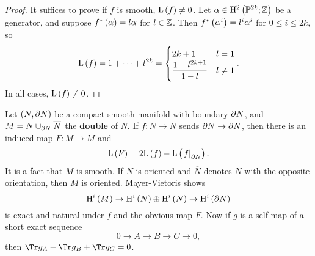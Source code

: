 \begin{proof}
It suffices to prove if $ f $ is smooth, $ \L\br{f} \ne 0 $. Let $ \alpha \in \H^2\br{\PP^{2k}; \ZZ} $ be a generator, and suppose $ f^*\br{\alpha} = l\alpha $ for $ l \in \mathbb{Z} $. Then $ f^*\br{\alpha^i} = l^i\alpha^i $ for $ 0 \le i \le 2k $, so
$$ \L\br{f} = 1 + \dots + l^{2k} =
\begin{cases}
2k + 1 & l = 1 \\
\dfrac{1 - l^{2k + 1}}{1 - l} & l \ne 1
\end{cases}.
$$
In all cases, $ \L\br{f} \ne 0 $.
\end{proof}

\begin{example*}
Let $ \br{N, \da N} $ be a compact smooth manifold with boundary $ \partial N $, and $ M = N \cup_{\partial N} \overline{N} $ the \textbf{double} of $ N $. If $ f : N \to N $ sends $ \partial N \to \partial N $, then there is an induced map $ F : M \to M $ and
$$ \L\br{F} = 2\L\br{f} - \L\br{\eval{f}_{\da N}}. $$
It is a fact that $ M $ is smooth. If $ N $ is oriented and $ \overline{N} $ denotes $ N $ with the opposite orientation, then $ M $ is oriented. Mayer-Vietoris shows
$$ \H^i\br{M} \to \H^i\br{N} \oplus \H^i\br{N} \to \H^i\br{\da N} $$
is exact and natural under $ f $ and the obvious map $ F $. Now if $ g $ is a self-map of a short exact sequence
$$ 0 \to A \to B \to C \to 0, $$
then $ \Tr g_A - \Tr g_B + \Tr g_C = 0 $.
\end{example*}

